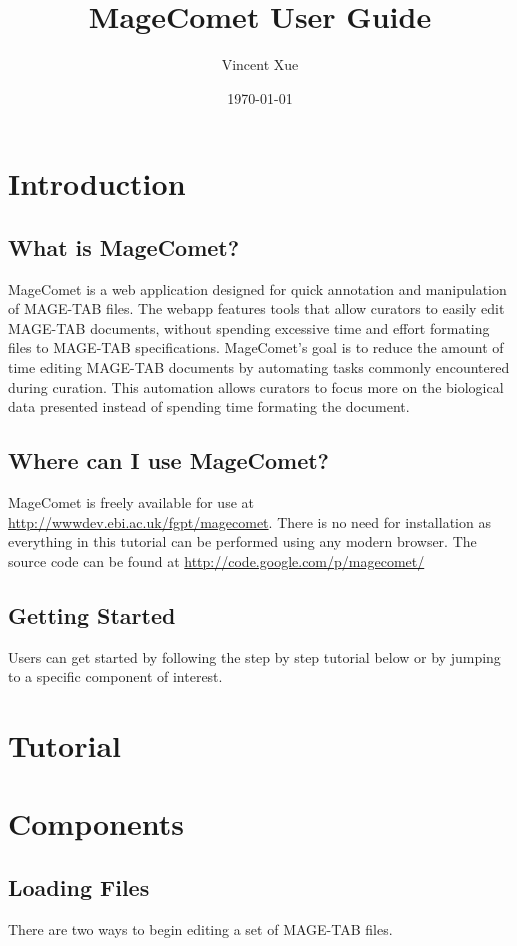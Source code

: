 \documentclass[a4paper]{article}
\title{MageComet User Guide}
\author{Vincent Xue}
\date{\today}
\begin{document}


\newpage
\tableofcontents
\newpage

\section{Introduction}
\subsection{What is MageComet?}
MageComet is a web application designed for quick annotation and manipulation of MAGE-TAB files. The webapp features tools that allow curators to easily edit MAGE-TAB documents, without spending excessive time and effort formating files to MAGE-TAB specifications. MageComet's goal is to reduce the amount of time editing MAGE-TAB documents by automating tasks commonly encountered during curation. This automation allows curators to focus more on the biological data presented instead of spending time formating the document.

\subsection{Where can I use MageComet?}

MageComet is freely available for use at \href{http://wwwdev.ebi.ac.uk/fgpt/magecomet}{http://wwwdev.ebi.ac.uk/fgpt/magecomet}. There is no need for installation as everything in this tutorial can be performed using any modern browser. The source code can be found at \href{http://code.google.com/p/magecomet/}{http://code.google.com/p/magecomet/}

\subsection{Getting Started}
Users can get started by following the step by step tutorial below or by jumping to a specific component of interest.


\section{Tutorial}

\section{Components}
\subsection{Loading Files}
There are two ways to begin editing a set of MAGE-TAB files.
\end{document}
